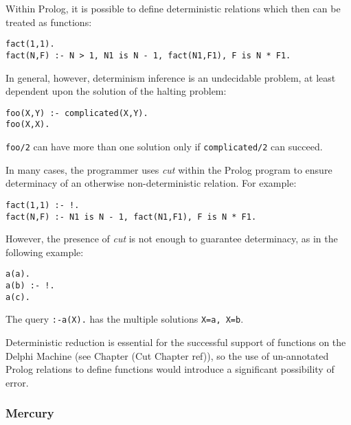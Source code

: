 \documentclass[a4paper,11pt,twoside]{article}
\begin{document}
Within Prolog, it is possible to define deterministic relations which then
can be treated as functions:

\begin{verbatim}
fact(1,1).
fact(N,F) :- N > 1, N1 is N - 1, fact(N1,F1), F is N * F1.
\end{verbatim}

In general, however, determinism inference is an undecidable problem, at
least dependent upon the solution of the halting problem:

\begin{verbatim}
foo(X,Y) :- complicated(X,Y).
foo(X,X).
\end{verbatim}

\texttt{foo/2} can have more than one solution only if
\texttt{complicated/2} can succeed.

In many cases, the programmer uses \textit{cut} within the Prolog
program to ensure determinacy of an otherwise non-deterministic
relation. For example:

\begin{verbatim}
fact(1,1) :- !.
fact(N,F) :- N1 is N - 1, fact(N1,F1), F is N * F1.
\end{verbatim}

However, the presence of \textit{cut} is not enough to
guarantee determinacy, as in the following example:

\begin{verbatim}
a(a).
a(b) :- !.
a(c).
\end{verbatim}

The query \texttt{:-a(X).} has the multiple solutions
\texttt{X=a, X=b}.

Deterministic reduction is essential for the successful
support of functions on the Delphi Machine (see Chapter
(Cut Chapter ref)), so the use of un-annotated Prolog relations to define
functions would introduce a significant possibility of error.

\subsubsection{Mercury}
\end{document}
